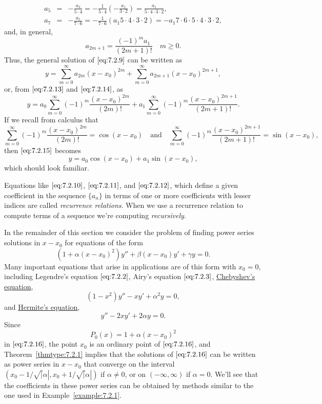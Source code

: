 \documentclass{ximera}
\begin{document}
\begin{example}
\begin{explanation}
\begin{eqnarray*}
a_5&=&-\frac{a_3}{5\cdot4}=-\frac{1}{5\cdot4}
 \left(-\frac{a_1}{3\cdot2}\right)=
 \frac{a_1}{5\cdot4\cdot3\cdot2}, \\
a_7&=&-\frac{a_5}{7\cdot6}=-\frac{1}{7\cdot6}
 \left({a_1}{5\cdot4\cdot3\cdot2}\right)
=-{a_1}{7\cdot6\cdot5\cdot4\cdot
 3\cdot2},
\end{eqnarray*}
and, in general,
\begin{equation}\label{eq:7.2.14}
a_{2m+1}=\frac{(-1)^ma_1}{(2m+1)!}\quad m\geq0.
\end{equation}
Thus, the general solution of $\eqref{eq:7.2.9}$ can be written as
$$
y=\sum_{m=0}^\infty a_{2m}(x-x_0)^{2m}+\sum_{m=0}^\infty a_{2m+1}(x-x_0)^{2m+1},
$$
or, from $\eqref{eq:7.2.13}$ and $\eqref{eq:7.2.14}$, as
\begin{equation}\label{eq:7.2.15}
y=a_0\sum_{m=0}^\infty(-1)^m\frac{(x-x_0)^{2m}}{(2m)!}
+a_1\sum_{m=0}^\infty(-1)^m\frac{(x-x_0)^{2m+1}}{(2m+1)!}.
\end{equation}
If we recall from calculus that
$$
\sum_{m=0}^\infty(-1)^m\frac{(x-x_0)^{2m}}{(2m)!}=\cos(x-x_0)
\quad\mbox{and}\quad
\sum_{m=0}^\infty(-1)^m\frac{(x-x_0)^{2m+1}}{(2m+1)!}=\sin(x-x_0),
$$
then $\eqref{eq:7.2.15}$ becomes
$$
y=a_0\cos(x-x_0)+a_1\sin(x-x_0),
$$
which should look familiar.
\end{explanation}
\end{example}

Equations like $\eqref{eq:7.2.10}$, $\eqref{eq:7.2.11}$, and $\eqref{eq:7.2.12}$, which
define a given coefficient in the sequence $\{a_n\}$ in terms of one
or more coefficients with lesser indices are called \textit{recurrence relations}. When we use a recurrence relation to compute terms of a sequence we're computing \textit{recursively}.

In  the remainder of this  section we  consider the problem of
finding power series solutions in $x-x_0$  for equations of the form
\begin{equation}\label{eq:7.2.16}
\left(1+\alpha(x-x_0)^2\right)y''+\beta(x-x_0) y'+\gamma y=0.
\end{equation}
Many important equations that arise in applications are of this
form with $x_0=0$, including  Legendre's equation $\eqref{eq:7.2.2}$,
Airy's equation $\eqref{eq:7.2.3}$,
\href{https://en.wikipedia.org/wiki/Chebyshev_equation}{Chebyshev's equation},
$$
(1-x^2)y''-xy'+\alpha^2 y=0,
$$
and
\href{https://en.wikipedia.org/wiki/Hermite_polynomials#Hermite's_differential_equation}{Hermite's equation},
$$
y''-2xy'+2\alpha y=0.
$$
Since
$$
P_0(x)=1+\alpha(x-x_0)^2
$$
in $\eqref{eq:7.2.16}$, the point $x_0$ is an ordinary point of
$\eqref{eq:7.2.16}$, and Theorem~\ref{thmtype:7.2.1} implies that the solutions
of $\eqref{eq:7.2.16}$ can be written as power series in $x-x_0$ that
converge on the interval $(x_0-1/\sqrt|\alpha|,x_0+1/\sqrt|\alpha|)$
if $\alpha\neq0$, or on $(-\infty,\infty)$ if $\alpha=0$. We'll see
that the coefficients in these power series can be obtained by methods
similar to the one used in Example~\ref{example:7.2.1}.
\end{document}
